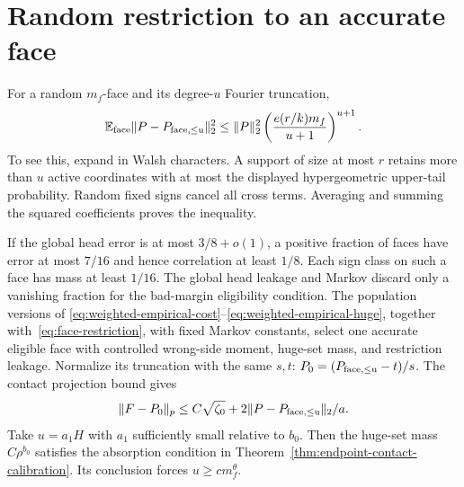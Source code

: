 \section{Random restriction to an accurate face}\label{sec:face-restriction}
For a random $m_f$-face and its degree-$u$ Fourier truncation,
\begin{equation}\label{eq:face-restriction}
 \mathbb E_{\rm face}\|P-P_{\rm face,\le u}\|_2^2
 \le\|P\|_2^2
       \left(\frac{e(r/k)m_f}{u+1}\right)^{u+1}.
\end{equation}
To see this, expand in Walsh characters. A support of size at most $r$
retains more than $u$ active coordinates with at most the displayed
hypergeometric upper-tail probability. Random fixed signs cancel all
cross terms. Averaging and summing the squared coefficients proves the
inequality.

If the global head error is at most $3/8+o(1)$, a positive fraction of
faces have error at most $7/16$ and hence correlation at least $1/8$.
Each sign class on such a face has mass at least $1/16$.
The global head leakage and Markov discard only a vanishing fraction
for the bad-margin eligibility condition. The population versions of
\eqref{eq:weighted-empirical-cost}--\eqref{eq:weighted-empirical-huge},
together with~\eqref{eq:face-restriction}, with fixed
Markov constants, select one accurate eligible face with controlled
wrong-side moment, huge-set mass, and restriction leakage.
Normalize its truncation with the same $s,t$:
$P_0=(P_{\rm face,\le u}-t)/s$. The contact projection bound gives
\[
 \|F-P_0\|_p\le C\sqrt{\zeta_0}
                +2\|P-P_{\rm face,\le u}\|_2/a.
\]
Take $u=a_1H$ with $a_1$ sufficiently small relative to $b_0$.
Then the huge-set mass $C\rho^{b_0}$ satisfies the absorption condition
in Theorem~\ref{thm:endpoint-contact-calibration}. Its conclusion forces
$u\ge c m_f^\theta$.
